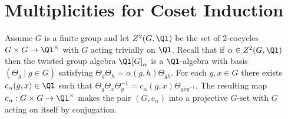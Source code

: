 \documentclass[eqthmnum,nocolour,skinny]{jt-calcs}
\DeclareMathOperator{\Fun}{Fun}
\begin{document}
%
%

\section{Multiplicities for Coset Induction}\label{sec:coset-multiplicities}
\begin{pa}\label{pa:conj-proj-G-set}
Assume $G$ is a finite group and let $Z^2(G,\Ql)$ be the set of $2$-cocycles $G \times G \to \Ql^{\times}$ with $G$ acting trivially on $\Ql$. Recall that if $\alpha \in Z^2(G,\Ql)$ then the twisted group algebra $\Ql[G]_{\alpha}$ is a $\Ql$-algebra with basis $(\Theta_g \mid g \in G)$ satisfying $\Theta_g\Theta_h = \alpha(g,h)\Theta_{gh}$. For each $g,x \in G$ there exists $c_{\alpha}(g,x) \in \Ql$ such that $\Theta_g\Theta_x\Theta_g^{-1} = c_{\alpha}(g,x)\Theta_{gxg^{-1}}$. The resulting map $c_{\alpha} : G \times G \to \Ql^{\times}$ makes the pair $(G,c_{\alpha})$ into a projective $G$-set with $G$ acting on itself by conjugation.
\end{pa}
\end{document}

